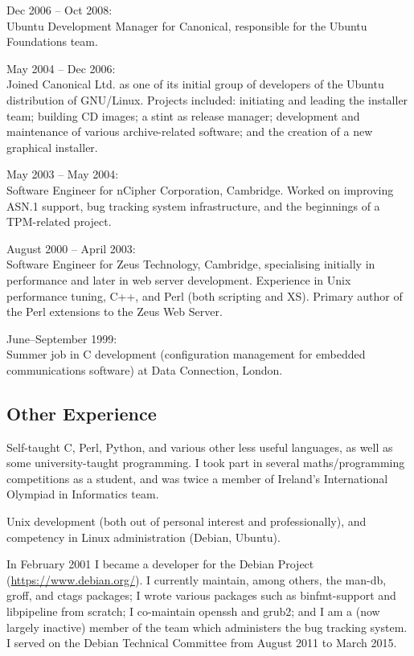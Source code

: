 \documentclass[a4paper,12pt]{report}
\begin{document}
    Dec 2006 -- Oct 2008: \nopagebreak\\
    Ubuntu Development Manager for Canonical, responsible for the Ubuntu
    Foundations team.

    May 2004 -- Dec 2006: \nopagebreak\\
    Joined Canonical Ltd. as one of its initial group of developers of the
    Ubuntu distribution of GNU/Linux. Projects included: initiating and leading
    the installer team; building CD images; a stint as release manager;
    development and maintenance of various archive-related software; and the
    creation of a new graphical installer.

    May 2003 -- May 2004: \nopagebreak\\
    Software Engineer for nCipher Corporation, Cambridge. Worked on improving
    ASN.1 support, bug tracking system infrastructure, and the beginnings of a
    TPM-related project.

    August 2000 -- April 2003: \nopagebreak\\
    Software Engineer for Zeus Technology, Cambridge, specialising initially in
    performance and later in web server development. Experience in Unix
    performance tuning, C++, and Perl (both scripting and XS). Primary author of
    the Perl extensions to the Zeus Web Server.

    June--September 1999: \nopagebreak\\
    Summer job in C development (configuration management for embedded
    communications software) at Data Connection, London.

    \subsection*{Other Experience}

    Self-taught C, Perl, Python, and various other less useful languages, as
    well as some university-taught programming. I took part in several
    maths/programming competitions as a student, and was twice a member of
    Ireland's International Olympiad in Informatics team.

    Unix development (both out of personal interest and professionally), and
    competency in Linux administration (Debian, Ubuntu).

    In February 2001 I became a developer for the Debian Project
    (\url{https://www.debian.org/}). I currently maintain, among others, the
    man-db, groff, and ctags packages; I wrote various packages such as
    binfmt-support and libpipeline from scratch; I co-maintain openssh and
    grub2; and I am a (now largely inactive) member of the team which
    administers the bug tracking system. I served on the Debian Technical
    Committee from August 2011 to March 2015.
\end{document}
